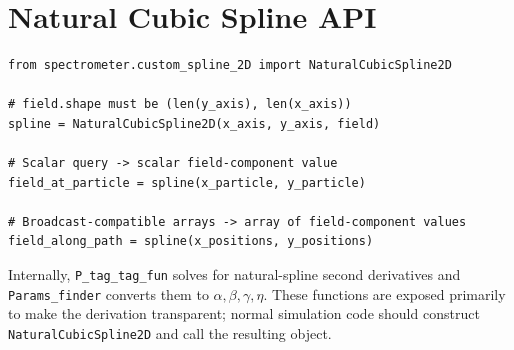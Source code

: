 \documentclass[11pt,a4paper]{report}
\newcommand{\code}[1]{\texttt{#1}}
\begin{document}
\chapter{Natural Cubic Spline API}

\begin{lstlisting}
from spectrometer.custom_spline_2D import NaturalCubicSpline2D

# field.shape must be (len(y_axis), len(x_axis))
spline = NaturalCubicSpline2D(x_axis, y_axis, field)

# Scalar query -> scalar field-component value
field_at_particle = spline(x_particle, y_particle)

# Broadcast-compatible arrays -> array of field-component values
field_along_path = spline(x_positions, y_positions)
\end{lstlisting}

Internally, \code{P\_tag\_tag\_fun} solves for natural-spline second
derivatives and \code{Params\_finder} converts them to
$\alpha,\beta,\gamma,\eta$.  These functions are exposed primarily to make
the derivation transparent; normal simulation code should construct
\code{NaturalCubicSpline2D} and call the resulting object.
\end{document}

